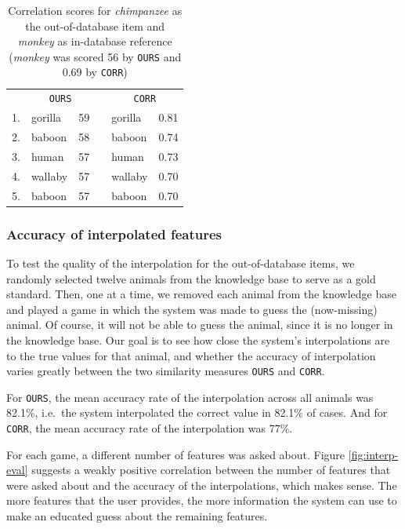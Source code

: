 \documentclass[11pt,a4paper]{article}
\begin{document}
\begin{table}[]
    \centering
    \begin{tabular}{clcclc}
    \toprule
    & \multicolumn{2}{c}{\texttt{OURS}} && \multicolumn{2}{c}{\texttt{CORR}} \\
    \cmidrule{2-3} \cmidrule{5-6}
    1. & gorilla & 59 && gorilla & 0.81 \\
    2. & baboon & 58 && baboon & 0.74 \\
    3. & human & 57 && human & 0.73 \\
    4. & wallaby & 57 && wallaby & 0.70 \\
    5. & baboon & 57 && baboon & 0.70 \\
    \bottomrule
    \end{tabular}
\caption{Correlation scores for \textit{chimpanzee} as the out-of-database item and \textit{monkey} as in-database reference (\textit{monkey} was scored 56 by \texttt{OURS} and 0.69 by \texttt{CORR})}
\label{tab:corr2}
\end{table}

\subsubsection{Accuracy of interpolated features}

To test the quality of the interpolation for the out-of-database items, we randomly selected twelve animals from the knowledge base to serve as a gold standard.
Then, one at a time, we removed each animal from the knowledge base and played a game in which the system was made to guess the (now-missing) animal. 
Of course, it will not be able to guess the animal, since it is no longer in the knowledge base.
Our goal is to see how close the system's interpolations are to the true values for that animal, and whether the accuracy of interpolation varies greatly between the two similarity measures \texttt{OURS} and \texttt{CORR}.

For \texttt{OURS}, the mean accuracy rate of the interpolation across all animals was 82.1\%, i.e.\ the system interpolated the correct value in 82.1\% of cases.
And for \texttt{CORR}, the mean accuracy rate of the interpolation was 77\%.

For each game, a different number of features was asked about.
Figure \ref{fig:interp-eval} suggests a weakly positive correlation between the number of features that were asked about and the accuracy of the interpolations, which makes sense.
The more features that the user provides, the more information the system can use to make an educated guess about the remaining features.
\end{document}
